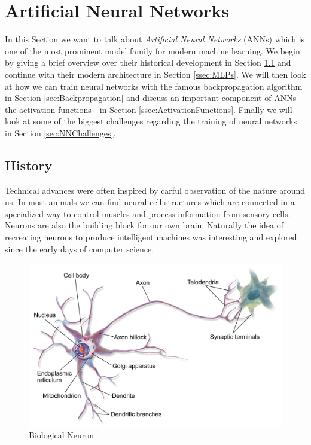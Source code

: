 \section{Artificial Neural Networks} \label{sec:ANNs}
In this Section we want to talk about \textit{Artificial Neural Networks} (ANNs) which is one of the most prominent model family for modern machine learning. We begin by giving a brief overview over their historical development in Section \ref{ssec:ANNHistory} and continue with their modern architecture in Section \ref{ssec:MLPs}. We will then look at how we can train neural networks with the famous backpropagation algorithm in Section \ref{sec:Backpropagation} and discuss an important component of ANNs - the activation functions - in Section \ref{ssec:ActivationFunctions}. Finally we will look at some of the biggest challenges regarding the training of neural networks in Section \ref{sec:NNChallenges}.

\subsection{History} \label{ssec:ANNHistory}
Technical advances were often inspired by carful observation of the nature around us. In most animals we can find neural cell structures which are connected in a specialized way to control muscles and process information from sensory cells. Neurons are also the building block for our own brain. Naturally the idea of recreating neurons to produce intelligent machines was interesting and explored since the early days of computer science. 

\begin{figure}[ht]
    
  \begin{center}
      \includegraphics[clip, width=0.75\columnwidth]{figures/deeplearning/neuron.png}
  \end{center}
  
  \caption[Biological Neuron]{Biological Neuron\footnotemark}
  \label{fig:biological_neuron}
\end{figure}


